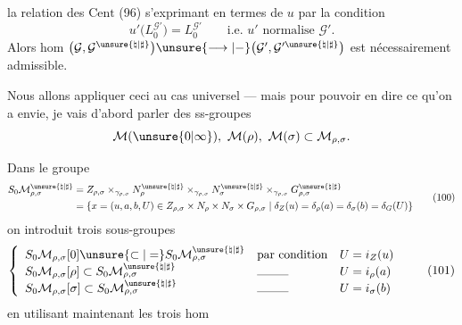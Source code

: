 
la relation des $\mathrm{Cent}$ (96) s'exprimant en termes de $u$ par la condition
\[
u'\bigl(L_0^{\mathcal{G}'}\bigr)
=L_0^{\mathcal{G}'}
\qquad\text{i.e. }u'\text{ normalise }\mathcal{G}'.
\tag{99}
\]
Alors  \inserted{$(\rho,\sigma)$-}hom
$\bigl(\mathcal{G},\mathcal{G}^{\unsure{\natural|\sharp}}\bigr)
\unsure{\longrightarrow|-}
\bigl(\mathcal{G}',\mathcal{G}^{\prime\unsure{\natural|\sharp}}\bigr)$
est nécessairement admissible.

Nous allons appliquer ceci au cas  universel --- mais pour pouvoir en dire  ce qu'on a envie, je vais d'abord parler des ss-groupes
\[
\mathcal{M}(\unsure{0|\infty}),\ \mathcal{M}(\rho),\ \mathcal{M}(\sigma)\subset\mathcal{M}_{\rho,\sigma}.
\]





Dans le groupe 
\[
\begin{aligned}
S_0\mathcal{M}_{\rho,\sigma}^{\unsure{\natural|\sharp}}
&=Z_{\rho,\sigma}\times_{\gamma_{\rho,\sigma}}
N_\rho^{\unsure{\natural|\sharp}}\times_{\gamma_{\rho,\sigma}}
N_\sigma^{\unsure{\natural|\sharp}}\times_{\gamma_{\rho,\sigma}}
G_{\rho,\sigma}^{\unsure{\natural|\sharp}}\\
&=\left\{x=(u,a,b,U)\in Z_{\rho,\sigma}\times N_\rho\times N_\sigma\times G_{\rho,\sigma}
\;\middle|\;\delta_Z(u)=\delta_\rho(a)=\delta_\sigma(b)=\delta_G(U)\right\}
\end{aligned}
\tag{100}
\]
on introduit trois sous-groupes
\[
\left\{
\begin{array}{lll}
S_0\mathcal{M}_{\rho,\sigma}[0]\unsure{\subset|=}S_0\mathcal{M}_{\rho,\sigma}^{\unsure{\natural|\sharp}}
&\text{par condition}& U=i_Z(u)\\
S_0\mathcal{M}_{\rho,\sigma}[\rho]\subset S_0\mathcal{M}_{\rho,\sigma}^{\unsure{\natural|\sharp}}
&\text{\rule{2.6em}{0.3pt}}& U=i_\rho(a)\\
S_0\mathcal{M}_{\rho,\sigma}[\sigma]\subset S_0\mathcal{M}_{\rho,\sigma}^{\unsure{\natural|\sharp}}
&\text{\rule{2.6em}{0.3pt}}& U=i_\sigma(b)
\end{array}\right.
\tag{101}
\]
en utilisant maintenant les trois hom 

